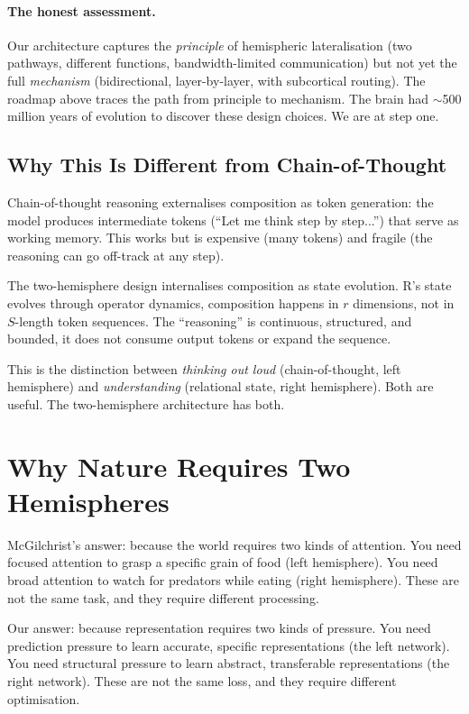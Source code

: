 \documentclass[11pt, a4paper]{article}
\theoremstyle{plain}
\theoremstyle{definition}
\theoremstyle{remark}
\begin{document}
\paragraph{The honest assessment.}
Our architecture captures the \emph{principle} of hemispheric lateralisation (two pathways, different functions, bandwidth-limited communication) but not yet the full \emph{mechanism} (bidirectional, layer-by-layer, with subcortical routing).
The roadmap above traces the path from principle to mechanism.
The brain had $\sim$500 million years of evolution to discover these design choices.
We are at step one.


\subsection{Why This Is Different from Chain-of-Thought}

Chain-of-thought reasoning externalises composition as token generation: the model produces intermediate tokens (``Let me think step by step...'') that serve as working memory.
This works but is expensive (many tokens) and fragile (the reasoning can go off-track at any step).

The two-hemisphere design internalises composition as state evolution.
R's state evolves through operator dynamics, composition happens in $r$ dimensions, not in $S$-length token sequences.
The ``reasoning'' is continuous, structured, and bounded, it does not consume output tokens or expand the sequence.

This is the distinction between \emph{thinking out loud} (chain-of-thought, left hemisphere) and \emph{understanding} (relational state, right hemisphere).
Both are useful.
The two-hemisphere architecture has both.


\section{Why Nature Requires Two Hemispheres}

McGilchrist's answer: because the world requires two kinds of attention.
You need focused attention to grasp a specific grain of food (left hemisphere).
You need broad attention to watch for predators while eating (right hemisphere).
These are not the same task, and they require different processing.

Our answer: because representation requires two kinds of pressure.
You need prediction pressure to learn accurate, specific representations (the left network).
You need structural pressure to learn abstract, transferable representations (the right network).
These are not the same loss, and they require different optimisation.
\end{document}
